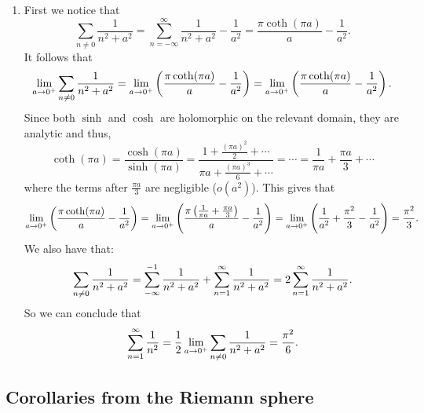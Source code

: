 \documentclass[11pt,a4paper]{article}
\begin{document}
\begin{solution}
\begin{enumerate}
\begin{small}
\[      - \frac{\pi \cot(\pi i a)}{i a} =
      \frac{\pi \coth(\pi a)}{a}
    \]
    which completes the first part of the proof.
  \end{small}
  \item[(2)] First we notice that
    \[
      \sum_{n \neq 0} \frac{1}{n^2 + a^2} =
      \sum_{n=-\infty}^{\infty} \frac{1}{n^2 + a^2} - \frac{1}{a^2} =
      \frac{\pi \coth(\pi a)}{a} - \frac{1}{a^2}.
    \]
    It follows that
    \[
      \lim_{a \to 0^+} \sum_{n \neq 0} \frac{1}{n^2 + a^2} =
      \lim_{a \to 0^+} \del{\frac{\pi \coth(\pi a)}{a} - \frac{1}{a^2}} =
      \lim_{a \to 0^+} \del{\frac{\pi \coth(\pi a)}{a} - \frac{1}{a^2}}.
    \]
    Since both $\sinh$ and $\cosh$ are holomorphic on the relevant domain,
    they are analytic and thus,
    \[
      \coth(\pi a) =
      \frac{\cosh(\pi a)}{\sinh(\pi a)} =
      \frac{1 + \frac{(\pi a)^2}{2} + \cdots}
      {\pi a + \frac{(\pi a)^3}{6} + \cdots} = \cdots =
      \frac{1}{\pi a} + \frac{\pi a}{3} + \cdots
    \]
    where the terms after $\frac{\pi a}{3}$ are negligible ($o(a^2)$).
    This gives that
    \[
      \lim_{a \to 0^+} \del{\frac{\pi \coth(\pi a)}{a} - \frac{1}{a^2}} =
      \lim_{a \to 0^+}
      \del{\frac{\pi\del{\frac{1}{\pi a} + \frac{\pi a}{3}}}{a} - \frac{1}{a^2}} =
      \lim_{a \to 0^+}
      \del{\frac{1}{a^2} + \frac{\pi^2}{3} - \frac{1}{a^2}} = \frac{\pi^2}{3}.
    \]
    We also have that:
    \[
      \sum_{n \neq 0} \frac{1}{n^2 + a^2} =
      \sum_{-\infty}^{-1} \frac{1}{n^2 + a^2} +
      \sum_{n=1}^{\infty} \frac{1}{n^2 + a^2} =
      2 \sum_{n=1}^{\infty} \frac{1}{n^2 + a^2}.
    \]
    So we can conclude that
    \[
      \sum_{n=1}^{\infty} \frac{1}{n^2} =
      \frac{1}{2} \lim_{a \to 0^+} \sum_{n \neq 0} \frac{1}{n^2 + a^2} =
      \frac{\pi^2}{6}.
    \]
\end{enumerate}
\end{solution}

\subsection{Corollaries from the Riemann sphere}
\end{document}
